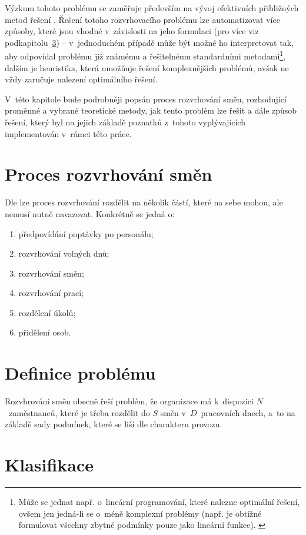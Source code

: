 \documentclass[twoside]{ctuthesis}
\begin{document}
Výzkum tohoto problému se zaměřuje především na vývoj efektivních přibližných metod řešení \cite{adamuthe2012tabu}. Řešení totoho rozvrhovacího problému lze automatizovat více způsoby, které jsou vhodné v~závislosti na jeho formulaci (pro více viz podkapitolu~\ref{sec:clasif}) -- v~jednoduchém případě může být možné ho interpretovat tak, aby odpovídal problému již známému a řešitelnému standardními metodami\footnote{Může se jednat např. o~lineární programování, které nalezne optimální řešení, ovšem jen jedná-li se o~méně komplexní problémy (např. je obtížné formulovat všechny zbytné podmínky pouze jako lineární funkce). \cite{blochliger2004modeling}}, dalším je heuristika, která umožňuje řešení komplexnějších problémů, avšak ne vždy zaručuje nalezení optimálního řešení. \cite{blochliger2004modeling}

V~této kapitole bude podrobněji popsán proces rozvrhování směn, rozhodující proměnné a vybrané teoretické metody, jak tento problém lze řešit a dále způsob řešení, který byl na jejich základě poznatků z~tohoto vyplývajících implementován v~rámci této práce.

\section{Proces rozvrhování směn}
Dle \cite{ernst2004staff} lze proces rozvrhování rozdělit na několik částí, které na sebe mohou, ale nemusí nutně navazovat. Konkrétně se jedná o:
\begin{enumerate}
	\item předpovídání poptávky po personálu;
	\item rozvrhování volných dnů;
	\item rozvrhování směn;
	\item rozvrhování prací;
	\item rozdělení úkolů;
	\item přidělení osob.
\end{enumerate}

\section{Definice problému}

Rozvhrování směn obecně řeší problém, že organizace má k~dispozici $N$~zaměstnanců, které je třeba rozdělit do $S$ směn v~$D$~pracovních dnech, a~to na základě sady podmínek, které se liší dle charakteru provozu.

\section{Klasifikace}
\label{sec:clasif}
\end{document}
